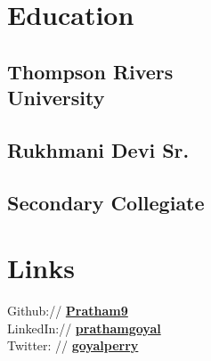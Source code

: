 \documentclass[]{pratham-resume-openfont}
\begin{document}
%
%

%
%

%
%

\begin{minipage}[t]{0.34\textwidth} 


\section{Education}
\subsection{Thompson Rivers \\ University} 
\sectionsep

\subsection{Rukhmani Devi Sr.}
\subsection{Secondary Collegiate}
\sectionsep


\section{Links} 
Github:// \href{https://https://github.com/Pratham9}{\bf Pratham9} \\
LinkedIn://  \href{https://www.linkedin.com/in/prathamgoyal}{\bf prathamgoyal} \\
Twitter: // \href{https://twitter.com/GoreKehnePerry}{\bf goyalperry}
\sectionsep



\end{minipage}
\end{document}

